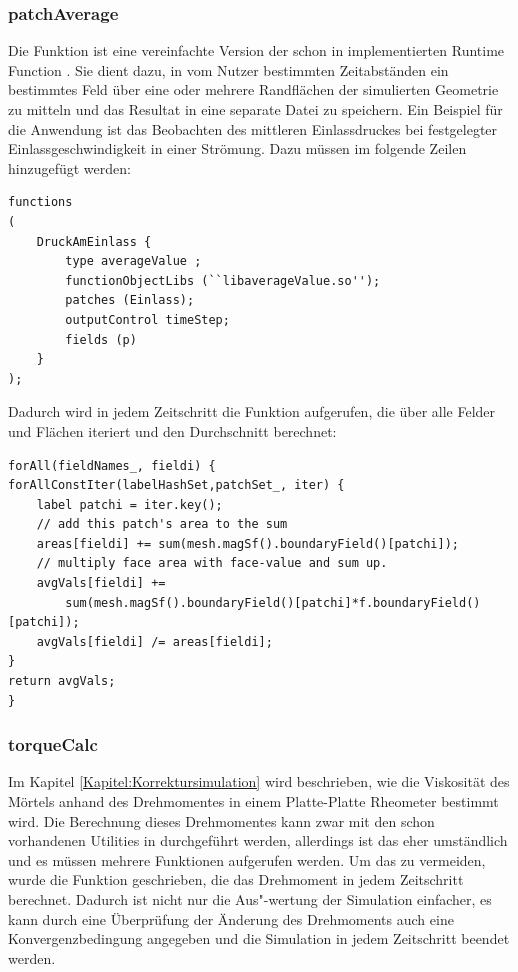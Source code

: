 \subsubsection{patchAverage}
Die Funktion  ist eine vereinfachte Version der schon in \openfoam{} implementierten Runtime Function .
Sie dient dazu, in vom Nutzer bestimmten Zeitabständen ein bestimmtes Feld über eine oder mehrere Randflächen der simulierten Geometrie zu mitteln und das Resultat in eine separate Datei zu speichern.
Ein Beispiel für die Anwendung ist das Beobachten des mittleren Einlassdruckes bei festgelegter Einlassgeschwindigkeit in einer Strömung.
Dazu müssen im  folgende Zeilen hinzugefügt werden:
%
\begin{lstlisting}
functions
(
    DruckAmEinlass {
        type averageValue ;
        functionObjectLibs (``libaverageValue.so'');
        patches (Einlass);
        outputControl timeStep;
        fields (p)
    }
);
\end{lstlisting}
%
Dadurch wird in jedem Zeitschritt die Funktion  aufgerufen, die über alle Felder und Flächen iteriert und den Durchschnitt berechnet:
%
\begin{lstlisting}
forAll(fieldNames_, fieldi) {    
forAllConstIter(labelHashSet,patchSet_, iter) {
    label patchi = iter.key();
    // add this patch's area to the sum
    areas[fieldi] += sum(mesh.magSf().boundaryField()[patchi]);
    // multiply face area with face-value and sum up.
    avgVals[fieldi] +=
        sum(mesh.magSf().boundaryField()[patchi]*f.boundaryField()[patchi]);
    avgVals[fieldi] /= areas[fieldi];
}
return avgVals;
}
\end{lstlisting}
%
\subsubsection{torqueCalc}
Im Kapitel \ref{Kapitel:Korrektursimulation} wird beschrieben, wie die Viskosität des Mörtels anhand des Drehmomentes in einem Platte-Platte Rheometer bestimmt wird.
Die Berechnung dieses Drehmomentes kann zwar mit den schon vorhandenen Utilities in \openfoam{} durchgeführt werden, allerdings ist das eher umständlich und es müssen mehrere Funktionen aufgerufen werden.
Um das zu vermeiden, wurde die Funktion  geschrieben, die das Drehmoment in jedem Zeitschritt berechnet.
Dadurch ist nicht nur die Aus"-wertung der Simulation einfacher, es kann durch eine Überprüfung der Änderung des Drehmoments auch eine Konvergenzbedingung angegeben und die Simulation in jedem Zeitschritt beendet werden.

